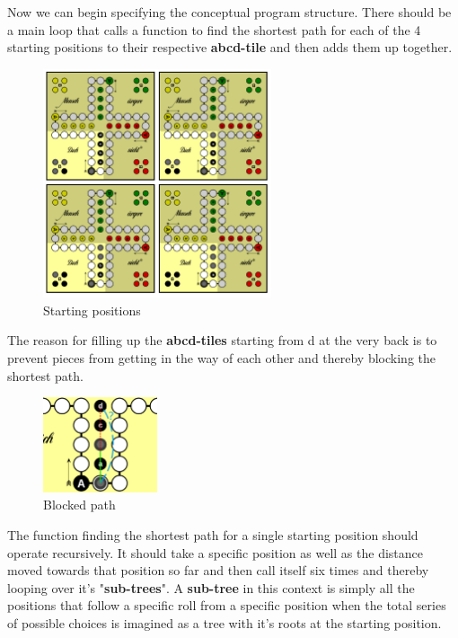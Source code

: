 \documentclass[12pt]{article}
\begin{document}
Now we can begin specifying the conceptual program structure.
There should be a main loop that calls a function to find the shortest path for each of the 4 starting positions to their respective \textbf{abcd-tile} and then adds them up together.

\begin{figure}[htbp]
    \centering
    \includegraphics[width=0.6\textwidth]{images/Figure3}
    \caption{Starting positions}
    \label{fig:startpos}
\end{figure}

The reason for filling up the \textbf{abcd-tiles} starting from d at the very back is to prevent pieces from getting in the way of each other and thereby blocking the shortest path.

\begin{figure}[htbp]
    \centering
    \includegraphics[width=0.3\textwidth]{images/Figure4}
    \caption{Blocked path}
    \label{fig:blockedpath}
\end{figure}

\newpage

The function finding the shortest path for a single starting position should operate recursively. It should take a specific position as well as the distance moved towards that position so far and then call itself six times and thereby looping over it's "\textbf{sub-trees}".
A \textbf{sub-tree} in this context is simply all the positions that follow a specific roll from a specific position when the total series of possible choices is imagined as a tree with it's roots at the starting position.
\end{document}
